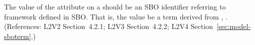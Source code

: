 The value of the  attribute on a \Model should be
an SBO identifier referring to  framework defined
in SBO.  That is, the value  be a term derived from
\changed{\sbointeractionID}, .  (References: L2V2
Section~4.2.1; L2V3 Section~4.2.2; L2V4 Section~\ref{sec:model-sboterm}.)
